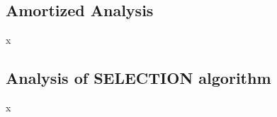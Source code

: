 \documentclass[a4paper]{article}
\begin{document}
\subsection{Amortized Analysis}

x

\subsection{Analysis of SELECTION algorithm}

x
\end{document}
